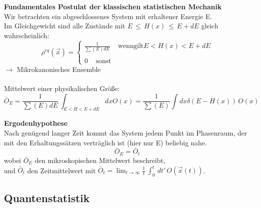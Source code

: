 \documentclass[a4paper,11pt]{scrartcl}
\begin{document}
\textbf{Fundamentales Postulat der klassischen statistischen Mechanik}\\
Wir betrachten ein abgeschlossenes System mit erhaltener Energie E. \\
Im Gleichgewicht sind alle Zustände mit $ E\, \leq \, H(x) \, \leq \, E+dE$ gleich wahrscheinlich:\\
\begin{equation}
  \rho^{eq} (\vec{x}) = \left\{ \begin{array}{c} \frac{1}{\sum(E)dE} \,\,\,\,\,\,\, \mathrm{wenn gilt } E < H(x) < E+dE \\ \\ 0\,\,\,\,\,\,\, \mathrm{sonst}  \end{array} \right.
\end{equation}
$\rightarrow $ Mikrokanonisches Ensemble\\
\\
Mittelwert einer physikalischen Größe: 
\begin{equation}
 \bar{O}_E = \frac{1}{\sum(E)dE} \, \int_{E<H<E+dE} dx O(x) = \frac{1}{\sum (E)} \int dx \delta (E-H(x)) \,O(x)
\end{equation}

\textbf{Ergodenhypothese}\\
Nach genügend langer Zeit kommt das System jedem Punkt im Phasenraum, der mit den Erhaltungssätzen verträglich ist (hier nur E) beliebig nahe. 
\begin{equation}
 \bar{O}_E = \bar{O}_t
\end{equation}
wobei $\bar{O}_E$ den mikroskopischen Mittelwert beschreibt, \\
und $\bar{O}_t$ den Zeitmittelwert mit $\bar{O}_t = \lim_{t \to \infty} \frac{1}{t} \, \int_0^t \, dt' \, O(\vec{x}(t))$.\\
\subsection{Quantenstatistik}
\end{document}
